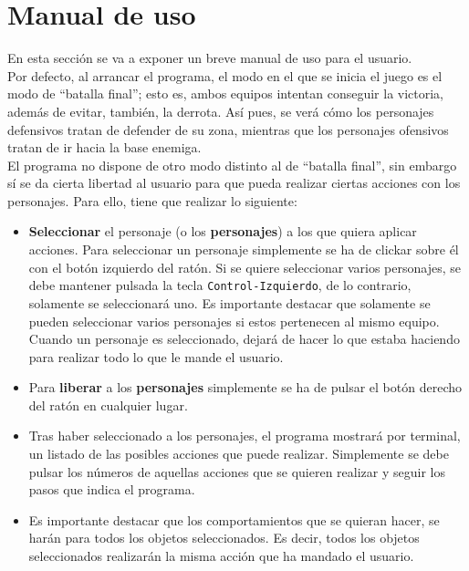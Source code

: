 \medskip
\section{Manual de uso}
En esta sección se va a exponer un breve manual de uso para el usuario. \\

Por defecto, al arrancar el programa, el modo en el que se inicia el juego es el modo de ``batalla final''; esto es, ambos equipos intentan conseguir la victoria, además de evitar, también, la derrota. Así pues, se verá cómo los personajes defensivos tratan de defender de su zona, mientras que los personajes ofensivos tratan de ir hacia la base enemiga. \\

El programa no dispone de otro modo distinto al de ``batalla final'', sin embargo sí se da cierta libertad al usuario para que pueda realizar ciertas acciones con los personajes. Para ello, tiene que realizar lo siguiente:
\begin{itemize}
 \item \textbf{Seleccionar} el personaje (o los \textbf{personajes}) a los que quiera aplicar acciones. Para seleccionar un personaje simplemente se ha de clickar sobre él con el botón izquierdo del ratón. Si se quiere seleccionar varios personajes, se debe mantener pulsada la tecla \texttt{Control-Izquierdo}, de lo contrario, solamente se seleccionará uno. Es importante destacar que solamente se pueden seleccionar varios personajes si estos pertenecen al mismo equipo. Cuando un personaje es seleccionado, dejará de hacer lo que estaba haciendo para realizar todo lo que le mande el usuario.
 
 \item Para \textbf{liberar} a los \textbf{personajes} simplemente se ha de pulsar el botón derecho del ratón en cualquier lugar.
 
 \item Tras haber seleccionado a los personajes, el programa mostrará por terminal, un listado de las posibles acciones que puede realizar. Simplemente se debe pulsar los números de aquellas acciones que se quieren realizar y seguir los pasos que indica el programa.
 \item Es importante destacar que los comportamientos que se quieran hacer, se harán para todos los objetos seleccionados. Es decir, todos los objetos seleccionados realizarán la misma acción que ha mandado el usuario.
\end{itemize}

